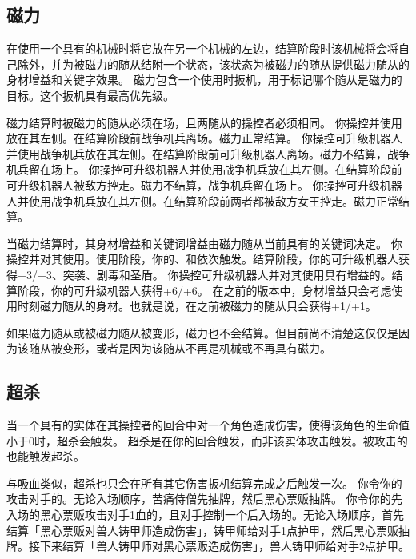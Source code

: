 \subsection{磁力}
\label{magentic}

在使用一个具有的机械时将它放在另一个机械的左边，结算阶段时该机械将会将自己除外，并为被磁力的随从结附一个状态，该状态为被磁力的随从提供磁力随从的身材增益和关键字效果。
\notice 磁力包含一个使用时扳机，用于标记哪个随从是磁力的目标。这个扳机具有最高优先级。

磁力结算时被磁力的随从必须在场，且两随从的操控者必须相同。
\example 你操控并使用放在其左侧。在结算阶段前战争机兵离场。磁力正常结算。
\example 你操控可升级机器人并使用战争机兵放在其左侧。在结算阶段前可升级机器人离场。磁力不结算，战争机兵留在场上。
\example 你操控可升级机器人并使用战争机兵放在其左侧。在结算阶段前可升级机器人被敌方控走。磁力不结算，战争机兵留在场上。
\example 你操控可升级机器人并使用战争机兵放在其左侧。在结算阶段前两者都被敌方女王控走。磁力正常结算。

当磁力结算时，其身材增益和关键词增益由磁力随从当前具有的关键词决定。
\example 你操控并对其使用。使用阶段，你的、和依次触发。结算阶段，你的可升级机器人获得+3/+3、突袭、剧毒和圣盾。
\example 你操控可升级机器人并对其使用具有增益的。结算阶段，你的可升级机器人获得+6/+6。
\notice {}在之前的版本中，身材增益只会考虑使用时刻磁力随从的身材。也就是说，在之前被磁力的随从只会获得+1/+1。

如果磁力随从或被磁力随从被变形，磁力也不会结算。但目前尚不清楚这仅仅是因为该随从被变形，或者是因为该随从不再是机械或不再具有磁力。

\subsection{超杀}
\label{overkill}

当一个具有的实体在其操控者的回合中对一个角色造成伤害，使得该角色的生命值小于0时，超杀会触发。
\notice 超杀是在你的回合触发，而非该实体攻击触发。被攻击的也能触发超杀。

与吸血类似，超杀也只会在所有其它伤害扳机结算完成之后触发一次。
\example 你令你的攻击对手的。无论入场顺序，苦痛侍僧先抽牌，然后黑心票贩抽牌。
\example 你令你的先入场的黑心票贩攻击对手1血的，且对手控制一个后入场的。无论入场顺序，首先结算「黑心票贩对兽人铸甲师造成伤害」，铸甲师给对手1点护甲，然后黑心票贩抽牌。接下来结算「兽人铸甲师对黑心票贩造成伤害」，兽人铸甲师给对手2点护甲。

